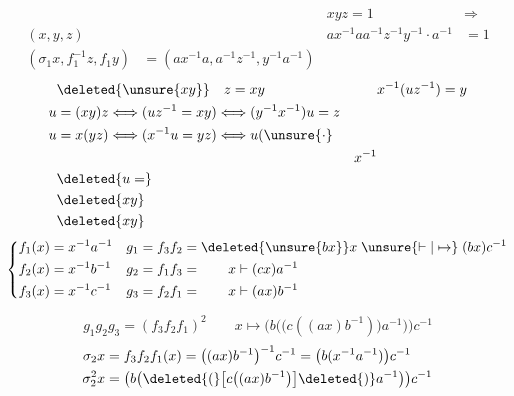 \[
\begin{aligned}
&&xyz=1&\Longrightarrow\\
(x,y,z)&&ax^{-1}aa^{-1}z^{-1}y^{-1}\cdot a^{-1}&=1\\
(\sigma_1 x,f_1^{-1}z,f_1y)&=(ax^{-1}a,a^{-1}z^{-1},y^{-1}a^{-1})
\end{aligned}
\]
\[
\begin{aligned}
&\deleted{\unsure{xy}}\quad z=xy && x^{-1}(uz^{-1})=y\\
u&=(xy)z\Longleftrightarrow(uz^{-1}=xy)\Longleftrightarrow (y^{-1}x^{-1})u=z\\
u&=x(yz)\Longleftrightarrow(x^{-1}u=yz)\Longleftrightarrow u(\unsure{\cdot}\\
&&x^{-1}\\
&\deleted{u=}\\
&\deleted{xy}\\
&\deleted{xy}
\end{aligned}
\]
\[
\left\{\begin{aligned}
f_1(x)&=x^{-1}a^{-1}&g_1&=f_3f_2=\deleted{\unsure{bx}}x\mathrel{\unsure{\vdash|\mapsto}}(bx)c^{-1}\\
f_2(x)&=x^{-1}b^{-1}&g_2&=f_1f_3=\qquad x\mathrel{\vdash}(cx)a^{-1}\\
f_3(x)&=x^{-1}c^{-1}&g_3&=f_2f_1=\qquad x\mathrel{\vdash}(ax)b^{-1}
\end{aligned}\right.
\]

\[
g_1g_2g_3=(f_3f_2f_1)^2\qquad x\mapsto\bigl(b\bigl(\bigl(c((ax)b^{-1})\bigr)a^{-1}\bigr)\bigr)c^{-1}
\]
\[
\begin{aligned}
\sigma_2x&=f_3f_2f_1(x)=\bigl((ax)b^{-1}\bigr)^{-1}c^{-1}
=\bigl(b(x^{-1}a^{-1})\bigr)c^{-1}\\
\sigma_2^2x&=\bigl(b\bigl(\deleted{(}\bigl[c\bigl((ax)b^{-1}\bigr)\bigr]\deleted{)}a^{-1}\bigr)\bigr)c^{-1}
\end{aligned}
\]

